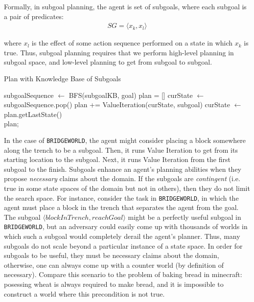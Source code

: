 \documentclass[]{article}
\begin{document}
Formally, in subgoal planning, the agent is set of subgoals, where each subgoal is a pair of predicates:
\begin{align}
SG = \langle x_k, x_l \rangle
\end{align}

where $x_l$ is the effect of some action sequence performed on 
a state in which $x_k$ is true. Thus, subgoal planning requires 
that we perform high-level planning in subgoal space, and low-level 
planning to get from subgoal to subgoal.

\begin{algorithm}
  \caption{Plan with Knowledge Base of Subgoals}
  \begin{algorithmic}[1]
    \State subgoalSequence $\gets$ BFS(subgoalKB, goal)
    \State plan = []
    \State curState $\gets$ subgoalSequence.pop()
    		\State plan += ValueIteration(curState, subgoal)
		\State curState $\gets$ plan.getLastState()
    \EndFor \\
    \Return plan;
  \end{algorithmic}
\end{algorithm}

In the case of \texttt{BRIDGEWORLD}, the agent might consider placing
a block somewhere along the trench to be a subgoal. Then, it runs
Value Iteration to get from its starting location to the subgoal.
Next, it runs Value Iteration from the first subgoal to the finish.
Subgoals enhance an agent's planning abilities when they propose {\it
  necessary} claims about the domain. If the subgoals are {\it
  contingent} (i.e. true in some state spaces of the domain but not in
others), then they do not limit the search space. For instance,
consider the task in \texttt{BRIDGEWORLD}, in which the agent must
place a block in the trench that separates the agent from the goal.
The subgoal $\langle blockInTrench, reachGoal\rangle$ might be a
perfectly useful subgoal in \texttt{BRIDGEWORLD}, but an adversary
could easily come up with thousands of worlds in which such a subgoal
would completely derail the agent's planner. Thus, many subgoals do
not scale beyond a particular instance of a state space. In order for
subgoals to be useful, they must be necessary claims about the domain,
otherwise, one can always come up with a counter world (by definition
of necessary).  Compare this scenario to the problem of baking bread
in minecraft: posessing wheat is always required to make bread, and it
is impossible to construct a world where this precondition is not
true.
\end{document}
